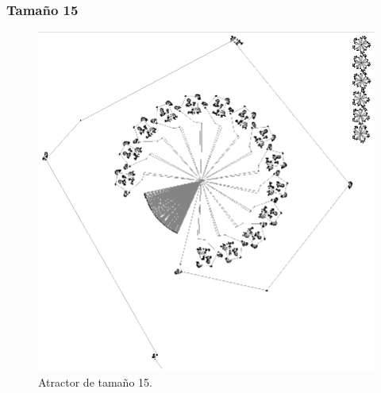 \documentclass[11pt]{article}
\begin{document}
			\subsubsection{Tamaño 15}
			\begin{figure}[H]
			\centering
			\includegraphics[scale=0.8]{resources/Atractores22/atractor_22_size_15.png}
			\caption{Atractor de tamaño 15.}\label{fig:picture}
			\end{figure}
\end{document}
